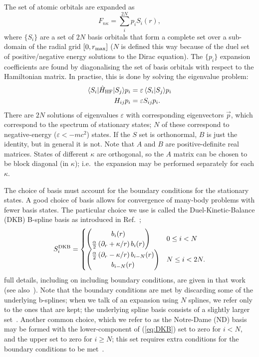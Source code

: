 \documentclass[10pt,twocolumn,a4paper]{article}%
\newcommand{\bra}[1]{\ensuremath{\langle #1|}}	%
\newcommand{\ket}[1]{\ensuremath{|#1\rangle}}	%
\newcommand{\braket}[1]{\ensuremath{\langle #1\rangle}}	%
\newcommand{\twocomp}[2]{\ensuremath{\begin{pmatrix}#1\\#2\end{pmatrix}}}	%
\newcommand{\be}{\begin{equation}}
\newcommand{\ee}{\end{equation}}
\def\en{\ensuremath{\varepsilon}}
\def\p{\ensuremath{\partial}}
\renewcommand{\k}{\ensuremath{\kappa}}
\begin{document}
The set of atomic orbitals are expanded as
\be
F_{n\k} = \sum_i^{2N} p_i S_i(r),
\ee
where $\{S_i\}$ are a set of $2N$ basis orbitals that form a complete set over a sub-domain of the radial grid $[0,r_{\rm max}]$ ($N$ is defined this way because of the duel set of positive/negative energy solutions to the Dirac equation).
The $\{p_i\}$ expansion coefficients are found by diagonalising the set of basis orbitals with respect to the Hamiltonian matrix.
In practise, this is done by solving the eigenvalue problem:
%
\begin{align}\label{eq:Hij-splines}
\bra{S_i}\hat H_{\rm HF}\ket{S_j} p_i &= \en\,\braket{S_i|S_j} p_i\\
H_{ij}p_i &= \en S_{ij}p_i.
\end{align}
%
There are $2N$ solutions of eigenvalues $\en$ with corresponding eigenvectors $\vec{p}$, which correspond to the spectrum of stationary states; $N$ of these correspond to negative-energy ($\en<-mc^2$) states.
If the $S$ set is orthonormal, $B$ is just the identity, but in general it is not.
Note that $A$ and $B$ are positive-definite real matrices.
States of different $\k$ are orthogonal, so the $A$ matrix can be chosen to be block diagonal (in $\k$); i.e.\ the expansion may be performed separately for each $\kappa$. %







The choice of basis must account for the boundary conditions for the stationary states.
A good choice of basis allows for convergence of many-body problems with fewer basis states.
The particular choice we use is called the Duel-Kinetic-Balance (DKB) B-spline basis as introduced in Ref.~\cite{Beloy2008};
\be\label{eq:DKB}
S_i^{\rm DKB}= \begin{cases}
\twocomp{b_i(r)}{\frac{\alpha}{2}\left(\p_r+\kappa/r\right)b_i(r)}  &  0\leq i<N \\
\twocomp{\frac{\alpha}{2}\left(\p_r-\kappa/r\right)b_{i-N}(r)}{b_{i-N}(r)}   & N\leq i<2N.
\end{cases}
\ee
full details, including on including boundary conditions,
are given in that work (see also~\cite{Johnson1988,AMBiT2018}).
Note that the boundary conditions are met by discarding some of the underlying b-splines; when we talk of an expansion using $N$ splines, we refer only to the ones that are kept; the underlying spline basis consists of a slightly larger set~\cite{Beloy2008}.
Another common choice, which we refer to as the Notre-Dame (ND) basis~\cite{Johnson1988} may be formed with the lower-component of (\ref{eq:DKB}) set to zero for $i<N$, and the upper set to zero for $i\geq N$; this set requires extra conditions for the boundary conditions to be met~\cite{Johnson1988}.
\end{document}

